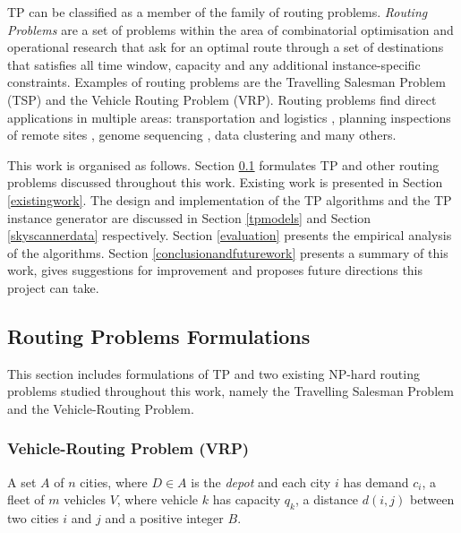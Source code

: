 \documentclass{mpaper}
\begin{document}
TP can be classified as a member of the family of routing problems. \textit{Routing Problems} are a set of problems within the area of combinatorial optimisation and operational research that ask for an optimal route through a set of destinations that satisfies all time window, capacity and any additional instance-specific constraints. Examples of routing problems are the Travelling Salesman Problem (TSP) and the Vehicle Routing Problem (VRP). Routing problems find direct applications in multiple areas: transportation and logistics \cite{Flood56}, planning inspections of remote sites \cite{Mahalanobis}, genome sequencing \cite{genomesequencing}, data clustering \cite{McCormick72} and many others.

This work is organised as follows. Section \ref{npcompleteproblems} formulates TP and other routing problems discussed throughout this work. Existing work is presented in Section \ref{existingwork}. The design and implementation of the TP algorithms and the TP instance generator are discussed in Section \ref{tpmodels} and Section \ref{skyscannerdata} respectively. Section \ref{evaluation} presents the empirical analysis of the algorithms. Section \ref{conclusionandfuturework} presents a summary of this work, gives suggestions for improvement and proposes future directions this project can take.

\subsection{Routing Problems Formulations}
\label{npcompleteproblems}

This section includes formulations of TP and two existing NP-hard \citep{thebible} routing problems studied throughout this work, namely the Travelling Salesman Problem and the Vehicle-Routing Problem.

\subsubsection{Vehicle-Routing Problem (VRP)}
\begin{instance}
A set $A$ of $n$ cities, where $D \in A$ is the \textit{depot} and each city $i$ has demand $c_{i}$, a fleet of $m$ vehicles $V$, where vehicle $k$ has capacity $q_{k}$, a distance $d(i,j)$ between two cities $i$ and $j$ and a positive integer $B$.
\end{instance}
\end{document}
